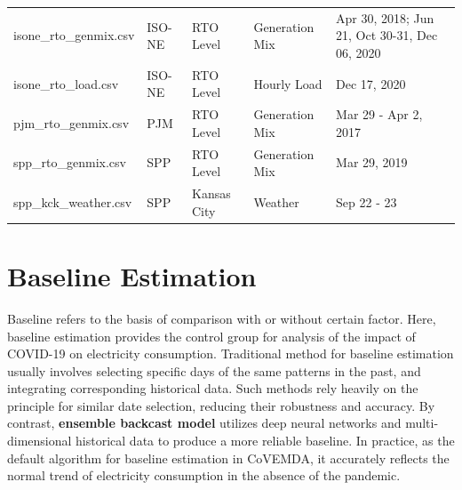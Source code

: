\documentclass[10pt]{article}
\newcommand{\covemda}{CoVEMDA}
\numberwithin{equation}{section}
\numberwithin{table}{section}
\numberwithin{figure}{section}
\begin{document}
\begin{table}[htbp]
\begin{tabular}{llllp{}}
	isone\_rto\_genmix.csv                    & ISO-NE                              & RTO Level                         & Generation Mix                        & Apr 30, 2018; Jun 21, Oct 30-31, Dec 06, 2020                                                                                \\
	isone\_rto\_load.csv                      & ISO-NE                              & RTO Level                         & Hourly Load                           & Dec 17, 2020                                                                                                                 \\
	pjm\_rto\_genmix.csv                      & PJM                                 & RTO Level                         & Generation Mix                        & Mar 29 - Apr 2, 2017                                                                                                         \\
	spp\_rto\_genmix.csv                      & SPP                                 & RTO Level                         & Generation Mix                        & Mar 29, 2019                                                                                                                 \\
	spp\_kck\_weather.csv                     & SPP                                 & Kansas City                       & Weather                               & Sep 22 - 23                \\                                                                                                 
	\bottomrule
	\end{tabular}
	\end{table}










\newpage
\section{Baseline Estimation} \label{sec:baseline}

Baseline refers to the basis of comparison with or without certain factor\cite{wijaya2014bias}\cite{mohajeryami2016error}. Here, baseline estimation provides the control group for analysis of the impact of COVID-19 on electricity consumption. Traditional method for baseline estimation usually involves selecting specific days of the same patterns in the past, and integrating corresponding historical data. Such methods rely heavily on the principle for similar date selection, reducing their robustness and accuracy. By contrast, \textbf{ensemble backcast model} utilizes deep neural networks and multi-dimensional historical data to produce a more reliable baseline. In practice, as the default algorithm for baseline estimation in \covemda{}, it accurately reflects the normal trend of electricity consumption in the absence of the pandemic.
\end{document}
